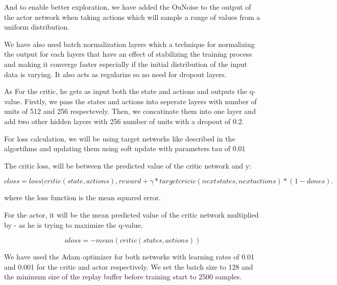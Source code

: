 \documentclass[12pt]{extarticle}
\begin{document}
And to enable better exploration, we have added the OuNoise to the output of the actor network when taking actions which will sample a range of values from a uniform distribution.


We have also used batch normalization layers \cite{ioffe2015batch} which a  technique for normalizing the output for each layers that have an effect of stabilizing the training process and making it converge faster especially if the initial distribution of the input data is varying. It also acts as regularize so no need for dropout layers.

As For the critic, he gets as input  both the state and actions and outputs the q-value. Firstly, we pass the states and actions into seperate layers 
with number of units of 512 and 256 respectevely. Then, we concatinate them into one layer and add two other hidden layers with 256 number of units with a dropout of 0.2.

For loss calculation, we will be using target networks like described in the algortihms and updating them using soft update with parameters tau of 0.01

The critic loss, will be between the predicted value of the critic network and y:

 

     \begin{equation} \label{critic_loss}
     closs= loss(critic(state,actions),reward+ \gamma*targetcricic(nextstates,nextactions)*(1-dones).
   \end{equation}
 
where the loss function is the mean squared error.

For the actor, it will be the mean predicted value of the critic network multiplied by - as  he is trying to maximize the q-value.

\begin{equation} \label{actor_loss}
     aloss= -mean(critic(states,actions))
   \end{equation}
   
We have used the Adam optimizer for both networks with learning rates of 0.01 and 0.001 for the critic and actor respectively. We set the batch size to 128 and the minimum size of the replay buffer before training start to 2500 samples.
\end{document}
